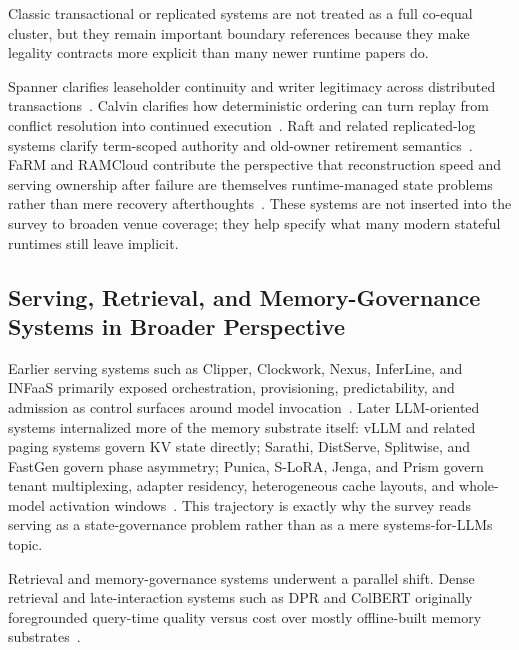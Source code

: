 Classic transactional or replicated systems are not treated as a full co-equal cluster, but they remain important boundary references because they make legality contracts more explicit than many newer runtime papers do.

Spanner clarifies leaseholder continuity and writer legitimacy across distributed transactions~\cite{corbett2012spanner}. Calvin clarifies how deterministic ordering can turn replay from conflict resolution into continued execution~\cite{thomson2012calvin}. Raft and related replicated-log systems clarify term-scoped authority and old-owner retirement semantics~\cite{ongaro2014raft}. FaRM and RAMCloud contribute the perspective that reconstruction speed and serving ownership after failure are themselves runtime-managed state problems rather than mere recovery afterthoughts~\cite{dragojevic2014farm,ousterhout2011ramcloud}. These systems are not inserted into the survey to broaden venue coverage; they help specify what many modern stateful runtimes still leave implicit.

\subsection{Serving, Retrieval, and Memory-Governance Systems in Broader Perspective}

Earlier serving systems such as Clipper, Clockwork, Nexus, InferLine, and INFaaS primarily exposed orchestration, provisioning, predictability, and admission as control surfaces around model invocation~\cite{crankshaw2017clipper,gujarati2020clockwork,shen2019nexus,crankshaw2020inferline,romero2021infaas}. Later LLM-oriented systems internalized more of the memory substrate itself: vLLM and related paging systems govern KV state directly; Sarathi, DistServe, Splitwise, and FastGen govern phase asymmetry; Punica, S-LoRA, Jenga, and Prism govern tenant multiplexing, adapter residency, heterogeneous cache layouts, and whole-model activation windows~\cite{kwon2023pagedattention,agrawal2024sarathi,zhong2024distserve,patel2024splitwise,holmes2024fastgen,chen2024punica,sheng2023slora,zhang2025jenga,yu2025prism}. This trajectory is exactly why the survey reads serving as a state-governance problem rather than as a mere systems-for-LLMs topic.

Retrieval and memory-governance systems underwent a parallel shift. Dense retrieval and late-interaction systems such as DPR and ColBERT originally foregrounded query-time quality versus cost over mostly offline-built memory substrates~\cite{karpukhin2020dpr,khattab2020colbert}.


